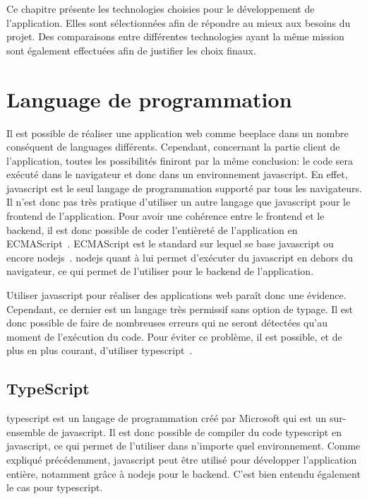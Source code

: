 Ce chapitre présente les technologies choisies pour le développement de l'application. Elles sont sélectionnées afin de répondre au mieux aux besoins du projet. Des comparaisons entre différentes technologies ayant la même mission sont également effectuées afin de justifier les choix finaux.

\section{Language de programmation}

Il est possible de réaliser une application web comme \gls{beeplace} dans un nombre conséquent de languages différents. Cependant, concernant la partie client de l'application, toutes les possibilités finiront par la même conclusion: le code sera exécuté dans le navigateur et donc dans un environnement \gls{javascript}. En effet, \gls{javascript} est le seul langage de programmation supporté par tous les navigateurs. Il n'est donc pas très pratique d'utiliser un autre langage que \gls{javascript} pour le frontend de l'application. Pour avoir une cohérence entre le frontend et le backend, il est donc possible de coder l'entièreté de l'application en ECMAScript~\cite{ecmascript}. ECMAScript est le standard sur lequel se base \gls{javascript} ou encore \gls{nodejs}~\cite{nodejs}. \gls{nodejs} quant à lui permet d'exécuter du \gls{javascript} en dehors du navigateur, ce qui permet de l'utiliser pour le backend de l'application.

Utiliser \gls{javascript} pour réaliser des applications web paraît donc une évidence. Cependant, ce dernier est un langage très permissif sans option de typage. Il est donc possible de faire de nombreuses erreurs qui ne seront détectées qu'au moment de l'exécution du code. Pour éviter ce problème, il est possible, et de plus en plus courant, d'utiliser \gls{typescript}~\cite{typescript}.

\subsection{TypeScript}

\gls{typescript} est un langage de programmation créé par Microsoft qui est un sur-ensemble de \gls{javascript}. Il est donc possible de compiler du code \gls{typescript} en \gls{javascript}, ce qui permet de l'utiliser dans n'importe quel environnement. Comme expliqué précédemment, \gls{javascript} peut être utilisé pour développer l'application entière, notamment grâce à \gls{nodejs} pour le backend. C'est bien entendu également le cas pour \gls{typescript}.

